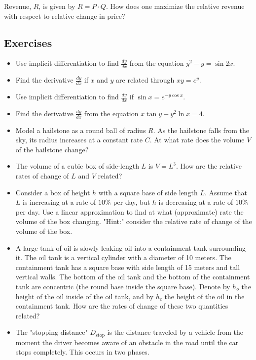 \documentclass[twoside,openright,titlepage,a4paper]{book}
\begin{document}
\begin{sloppypar}
Revenue, $R$, is given by $R = P \cdot Q$. How does one maximize the relative revenue with respect to relative change in price?

\subsection{Exercises}

\begin{itemize}
\item Use implicit differentiation to find $\displaystyle \frac{dy}{dx}$ from the equation $y^2 - y = \sin 2x$.
\item Find the derivative $\displaystyle \frac{dy}{dx}$ if $x$ and $y$ are related through $xy = e^y$.
\item Use implicit differentiation to find $\displaystyle \frac{dy}{dx}$ if $\sin x = e^{-y\cos x}$.
\item Find the derivative $\displaystyle \frac{dy}{dx}$ from the equation $x\tan y - y^2\ln x = 4$.
\item Model a hailstone as a round ball of radius $R$. As the hailstone falls from the sky, its radius increases at a constant rate $C$. At what rate does the volume $V$ of the hailstone change?
\item The volume of a cubic box of side-length $L$ is $V = L^3$. How are the relative rates of change of $L$ and $V$ related?
\item Consider a box of height $h$ with a square base of side length $L$. Assume that $L$ is increasing at a rate of $10\% $ per day, but $h$ is decreasing at a rate of $10\%$ per day. Use a linear approximation to find at what (approximate) rate the volume of the box changing. "Hint:" consider the relative rate of change of the volume of the box.
\item A large tank of oil is slowly leaking oil into a containment tank surrounding it. The oil tank is a vertical cylinder with a diameter of 10 meters. The containment tank has a square base with side length of 15 meters and tall vertical walls. The bottom of the oil tank and the bottom of the containment tank are concentric (the round base inside the square base). Denote by $h_o$ the height of the oil inside of the oil tank, and by $h_c$ the height of the oil in the containment tank. How are the rates of change of these two quantities related?
\item The "stopping distance" $D_\mathrm{stop}$ is the distance traveled by a vehicle from the moment the driver becomes aware of an obstacle in the road until the car stops completely. This occurs in two phases.\\

\end{itemize}
\end{sloppypar}
\end{document}
